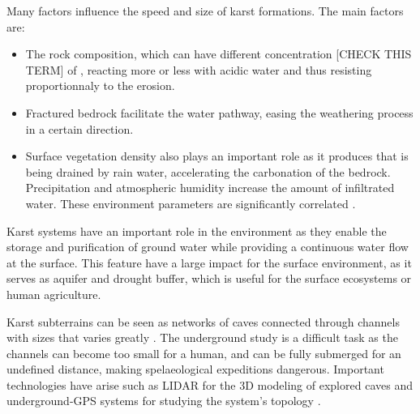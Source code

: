 Many factors influence the speed and size of karst formations. The main factors are:
\begin{itemize}
    \item The rock composition, which can have different concentration [CHECK THIS TERM] of , reacting more or less with acidic water and thus resisting proportionnaly to the erosion.
    \item Fractured bedrock facilitate the water pathway, easing the weathering process in a certain direction. 
    \item Surface vegetation density also plays an important role as it produces  that is being drained by rain water, accelerating the carbonation of the bedrock. Precipitation and atmospheric humidity increase the amount of infiltrated water. These environment parameters are significantly correlated \cite{Bari2021}.
\end{itemize}

Karst systems have an important role in the environment as they enable the storage and purification of ground water while providing a continuous water flow at the surface. This feature have a large impact for the surface environment, as it serves as aquifer and drought buffer, which is useful for the surface ecosystems or human agriculture.

Karst subterrains can be seen as networks of caves connected through channels with sizes that varies greatly \cite{Collon2017,Collon2021}. The underground study is a difficult task as the channels can become too small for a human, and can be fully submerged for an undefined distance, making spelaeological expeditions dangerous. Important technologies have arise such as LIDAR for the 3D modeling of explored caves and underground-GPS systems for studying the system's topology \cite{Collon2017}.



